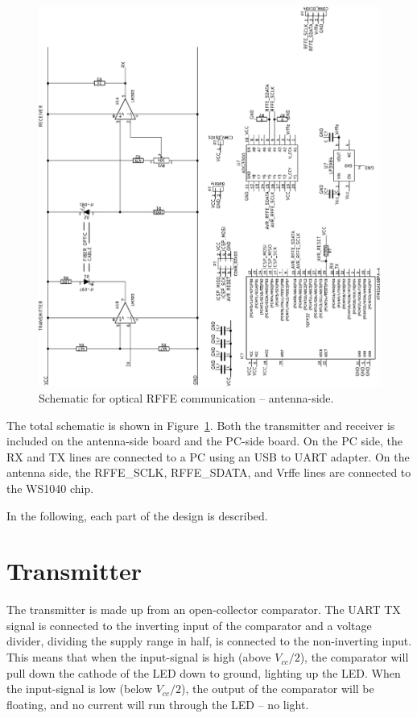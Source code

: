 \begin{figure}[htbp]
    \centering
    \includegraphics[angle=270, width=\linewidth]{img/optical_rffe/schematic}
    \caption{Schematic for optical RFFE communication -- antenna-side. }
    \label{fig:rffe_schematic}
\end{figure}

The total schematic is shown in Figure~\ref{fig:rffe_schematic}. Both the transmitter and receiver is included on the antenna-side board and the PC-side board. On the PC side, the RX and TX lines are connected to a PC using an USB to UART adapter. On the antenna side, the RFFE\_SCLK, RFFE\_SDATA, and Vrffe lines are connected to the WS1040 chip.

In the following, each part of the design is described.

\section{Transmitter}
The transmitter is made up from an open-collector comparator. The UART TX signal is connected to the inverting input of the comparator and a voltage divider, dividing the supply range in half, is connected to the non-inverting input. This means that when the input-signal is high (above $V_{cc}/2$), the comparator will pull down the cathode of the LED down to ground, lighting up the LED. When the input-signal is low (below $V_{cc}/2$), the output of the comparator will be floating, and no current will run through the LED -- no light.

